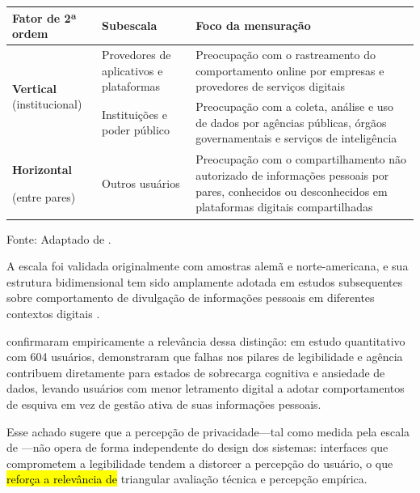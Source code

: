 \documentclass[
	12pt,				%
	oneside,			%
	a4paper,			%
	english,			%
	brazil				%
	]{abntex2ppgsi}
\begin{document}
\begin{quadro}[h]
    \centering
    \caption{Estrutura da \textit{Online Privacy Concerns 
    Scale} por fator e subescala}
    \label{tab:masur-escala}
    \renewcommand{\arraystretch}{1.4}
    \small
    \begin{tabular}{p{2.8cm}p{3.8cm}p{5cm}}
        \hline
        \textbf{Fator de 2ª ordem} & 
        \textbf{Subescala} & 
        \textbf{Foco da mensuração} \\
        \hline
        \multirow{2}{2.8cm}{\textbf{Vertical} 
        (institucional)}
        & Provedores de aplicativos e plataformas 
        & Preocupação com o rastreamento do 
          comportamento online por empresas e 
          provedores de serviços digitais \\
        \cline{2-3}
        & Instituições e poder público 
        & Preocupação com a coleta, análise e uso 
          de dados por agências públicas, órgãos 
          governamentais e serviços de inteligência \\
        \hline
        \textbf{Horizontal}
        
        (entre pares)
        & Outros usuários 
        & Preocupação com o compartilhamento não 
          autorizado de informações pessoais por 
          pares, conhecidos ou desconhecidos em 
          plataformas digitais compartilhadas \\
        \hline
    \end{tabular}

    \vspace{0.2cm}
    {\small Fonte: Adaptado de .}
\end{quadro}

    A escala foi validada originalmente com amostras alemã e norte-americana, e sua estrutura bidimensional tem sido amplamente adotada em estudos subsequentes sobre comportamento de divulgação de informações pessoais em diferentes contextos digitais \cite{masur2019situational}.

     confirmaram empiricamente a relevância dessa distinção: em estudo quantitativo com 604 usuários, demonstraram que falhas nos pilares de legibilidade e agência contribuem diretamente para estados de sobrecarga cognitiva e ansiedade de dados, levando usuários com menor letramento digital a adotar comportamentos de esquiva em vez de gestão ativa de suas informações pessoais.

    Esse achado sugere que a percepção de privacidade---tal como medida pela escala de ---não opera de forma independente do design dos sistemas: interfaces que comprometem a legibilidade tendem a distorcer a percepção do usuário, o que \hl{reforça a relevância de} triangular avaliação técnica e percepção empírica.
\end{document}
